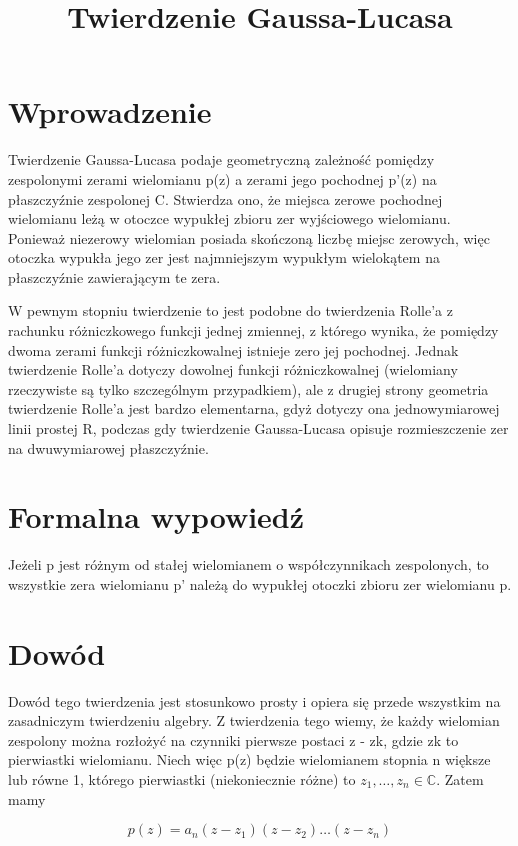 \documentclass{article}
\begin{document}
\title{Twierdzenie Gaussa-Lucasa}
\maketitle

\section*{Wprowadzenie}
Twierdzenie Gaussa-Lucasa podaje geometryczną zależność pomiędzy zespolonymi zerami wielomianu p(z) a zerami jego pochodnej p'(z) na płaszczyźnie zespolonej C. Stwierdza ono, że miejsca zerowe pochodnej wielomianu leżą w otoczce wypukłej zbioru zer wyjściowego wielomianu. Ponieważ niezerowy wielomian posiada skończoną liczbę miejsc zerowych, więc otoczka wypukła jego zer jest najmniejszym wypukłym wielokątem na płaszczyźnie zawierającym te zera.

W pewnym stopniu twierdzenie to jest podobne do twierdzenia Rolle’a z rachunku różniczkowego funkcji jednej zmiennej, z którego wynika, że pomiędzy dwoma zerami funkcji różniczkowalnej istnieje zero jej pochodnej. Jednak twierdzenie Rolle’a dotyczy dowolnej funkcji różniczkowalnej (wielomiany rzeczywiste są tylko szczególnym przypadkiem), ale z drugiej strony geometria twierdzenie Rolle’a jest bardzo elementarna, gdyż dotyczy ona jednowymiarowej linii prostej R, podczas gdy twierdzenie Gaussa-Lucasa opisuje rozmieszczenie zer na dwuwymiarowej płaszczyźnie.  

\section*{Formalna wypowiedź}

Jeżeli p jest różnym od stałej wielomianem o współczynnikach zespolonych, to wszystkie zera wielomianu p' należą do wypukłej otoczki zbioru zer wielomianu p.

\section*{Dowód}
Dowód tego twierdzenia jest stosunkowo prosty i opiera się przede wszystkim na zasadniczym twierdzeniu algebry. Z twierdzenia tego wiemy, że każdy wielomian zespolony można rozłożyć na czynniki pierwsze postaci z - zk, gdzie zk to pierwiastki wielomianu. Niech więc p(z) będzie wielomianem stopnia n większe lub równe 1, którego pierwiastki (niekoniecznie różne) to $ z_{1},\dots ,z_{n}\in \mathbb {C}$. Zatem mamy 

\begin{displaymath}
	p(z)=a_{n}(z-z_{1})(z-z_{2})\ldots (z-z_{n})
\end{displaymath}
\end{document}
